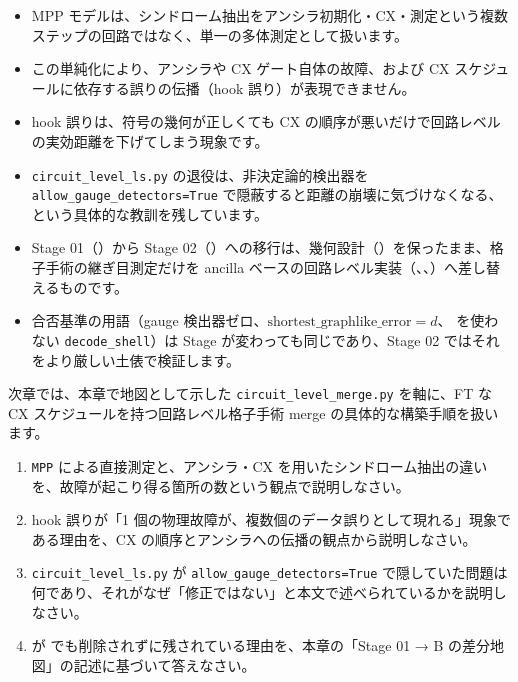 \begin{itemize}
  \item MPP モデルは、シンドローム抽出をアンシラ初期化・CX・測定という複数ステップの回路ではなく、単一の多体測定として扱います。
  \item この単純化により、アンシラや CX ゲート自体の故障、および CX スケジュールに依存する誤りの伝播（hook 誤り）が表現できません。
  \item hook 誤りは、符号の幾何が正しくても CX の順序が悪いだけで回路レベルの実効距離を下げてしまう現象です。
  \item \texttt{circuit\_level\_ls.py} の退役は、非決定論的検出器を \texttt{allow\_gauge\_detectors=True} で隠蔽すると距離の崩壊に気づけなくなる、という具体的な教訓を残しています。
  \item Stage 01（）から Stage 02（）への移行は、幾何設計（）を保ったまま、格子手術の継ぎ目測定だけを ancilla ベースの回路レベル実装（、、）へ差し替えるものです。
  \item 合否基準の用語（gauge 検出器ゼロ、$\mathrm{shortest\_graphlike\_error}=d$、 を使わない \texttt{decode\_shell}）は Stage が変わっても同じであり、Stage 02 ではそれをより厳しい土俵で検証します。
\end{itemize}

次章では、本章で地図として示した \texttt{circuit\_level\_merge.py} を軸に、FT な CX スケジュールを持つ回路レベル格子手術 merge の具体的な構築手順を扱います。

\begin{exercise}
  \begin{enumerate}
    \item \texttt{MPP} による直接測定と、アンシラ・CX を用いたシンドローム抽出の違いを、故障が起こり得る箇所の数という観点で説明しなさい。
    \item hook 誤りが「1 個の物理故障が、複数個のデータ誤りとして現れる」現象である理由を、CX の順序とアンシラへの伝播の観点から説明しなさい。
    \item \texttt{circuit\_level\_ls.py} が \texttt{allow\_gauge\_detectors=True} で隠していた問題は何であり、それがなぜ「修正ではない」と本文で述べられているかを説明しなさい。
    \item {} が  でも削除されずに残されている理由を、本章の「Stage 01 → B の差分地図」の記述に基づいて答えなさい。
  \end{enumerate}
\end{exercise}

